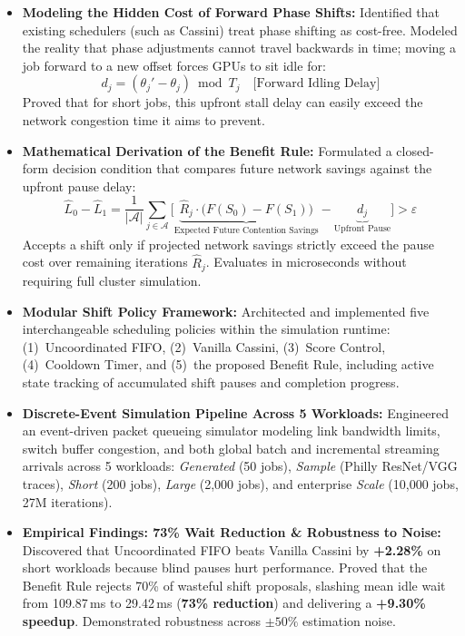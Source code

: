 \documentclass[11pt,a4paper]{article}
\begin{document}
\begin{itemize}[leftmargin=1.2em, itemsep=3.5pt]
    \item \textbf{Modeling the Hidden Cost of Forward Phase Shifts:}
    Identified that existing schedulers (such as Cassini) treat phase shifting as cost-free. Modeled the reality that phase adjustments cannot travel backwards in time; moving a job forward to a new offset forces GPUs to sit idle for:
    \[
    d_j = (\theta_j' - \theta_j) \bmod T_j \quad \text{[Forward Idling Delay]}
    \]
    Proved that for short jobs, this upfront stall delay can easily exceed the network congestion time it aims to prevent.

    \item \textbf{Mathematical Derivation of the Benefit Rule:}
    Formulated a closed-form decision condition that compares future network savings against the upfront pause delay:
    \[
    \widehat{L}_0 - \widehat{L}_1 = \frac{1}{|\mathcal{A}|}\sum_{j \in \mathcal{A}}\Big[ \underbrace{\widehat{R}_j \cdot \big(F(S_0) - F(S_1)\big)}_{\text{Expected Future Contention Savings}} - \underbrace{d_j}_{\text{Upfront Pause}} \Big] > \varepsilon
    \]
    Accepts a shift only if projected network savings strictly exceed the pause cost over remaining iterations $\widehat{R}_j$. Evaluates in microseconds without requiring full cluster simulation.

    \item \textbf{Modular Shift Policy Framework:}
    Architected and implemented five interchangeable scheduling policies within the simulation runtime: (1)~Uncoordinated FIFO, (2)~Vanilla Cassini, (3)~Score Control, (4)~Cooldown Timer, and (5)~the proposed Benefit Rule, including active state tracking of accumulated shift pauses and completion progress.

    \item \textbf{Discrete-Event Simulation Pipeline Across 5 Workloads:}
    Engineered an event-driven packet queueing simulator modeling link bandwidth limits, switch buffer congestion, and both global batch and incremental streaming arrivals across 5 workloads: \emph{Generated} (50 jobs), \emph{Sample} (Philly ResNet/VGG traces), \emph{Short} (200 jobs), \emph{Large} (2,000 jobs), and enterprise \emph{Scale} (10,000 jobs, 27M iterations).

    \item \textbf{Empirical Findings: 73\% Wait Reduction \& Robustness to Noise:}
    Discovered that Uncoordinated FIFO beats Vanilla Cassini by \textbf{+2.28\%} on short workloads because blind pauses hurt performance. Proved that the Benefit Rule rejects 70\% of wasteful shift proposals, slashing mean idle wait from 109.87\,ms to 29.42\,ms (\textbf{73\% reduction}) and delivering a \textbf{+9.30\% speedup}. Demonstrated robustness across $\pm 50\%$ estimation noise.
\end{itemize}
\end{document}
